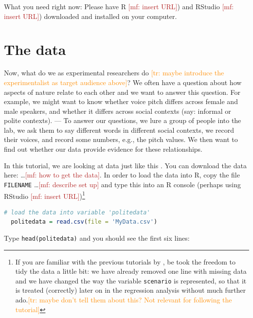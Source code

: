 \documentclass[nobib]{tufte-handout}
\renewcommand{\mf}[1]{\textcolor{firebrick}{[mf: #1]}}
\newcommand{\tr}[1]{\textcolor{DarkOrange}{[tr: #1]}}
\newcommand{\ri}[1]{\lstinline{#1}}  %
\begin{document}
What you need right now: Please have R \mf{insert URL}) and RStudio \mf{insert URL}) downloaded and installed on your computer.


\section{The data}
\label{sec:data}

Now, what do we as experimental researchers do \tr{maybe introduce the experimentalist as target audience above}? We often have a question about how aspects of nature relate to each other and we want to answer this question. For example, we might want to know whether voice pitch differs across female and male speakers, and whether it differs across social contexts (say: informal or polite contexts). --- To answer our questions, we lure a group of people into the lab, we ask them to say different words in different social contexts, we record their voices, and record some numbers, e.g., the pitch values. We then want to find out whether our data provide evidence for these relationships.

In this tutorial, we are looking at data just like this \citep[following[]{Winter2013:Linear-models-a} \citep[taken from][]{WinterGrawunder2012:The-Phonetic-Pr}. You can download the data here: \dots \mf{how to get the data}.  
In order to load the data into R, copy the file \texttt{FILENAME} \dots \mf{describe set up} and type this into an R console (perhaps using RStudio \mf{insert URL})\footnote{If you are familiar with the previous tutorials by \citet{Winter2013:Linear-models-a}, be took the freedom to tidy the data a little bit: we have already removed one line with missing data and we have changed the way the variable
\texttt{scenario} is represented, so that it is treated (correctly) later on in the regression analysis without much further ado.\tr{maybe don't tell them about this? Not relevant for following the tutorial}}

\medskip

\begin{lstlisting}[language=R]
  # load the data into variable 'politedata'
  politedata = read.csv(file = 'MyData.csv')     
\end{lstlisting}

\vspace*{-0.5cm}

\noindent Type \ri{head(politedata)} and you should see the first six lines:

\medskip
\end{document}
